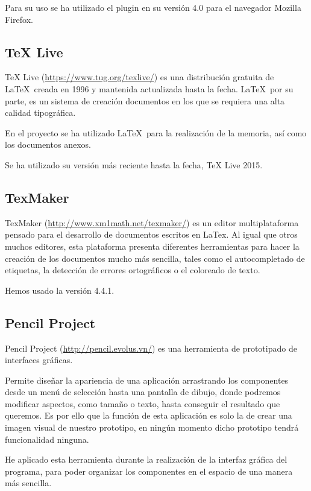 Para su uso se ha utilizado el plugin en su versión 4.0 para el navegador Mozilla Firefox.

\subsection{TeX Live}
TeX Live (\url{https://www.tug.org/texlive/}) es una distribución gratuita de \LaTeX\ creada en 1996 y mantenida actualizada hasta la fecha. \LaTeX\, por su parte, es un sistema de creación documentos en los que se requiera una alta calidad tipográfica.

En el proyecto se ha utilizado \LaTeX\ para la realización de la memoria, así como los documentos anexos.

Se ha utilizado su versión más reciente hasta la fecha, TeX Live 2015.

\subsection{TexMaker}

TexMaker (\url{http://www.xm1math.net/texmaker/}) es un editor multiplataforma pensado para el desarrollo de documentos escritos en LaTex. Al igual que otros muchos editores, esta plataforma presenta diferentes herramientas para hacer la creación de los documentos mucho más sencilla, tales como el autocompletado de etiquetas, la detección de errores ortográficos o el coloreado de texto.

Hemos usado la versión 4.4.1.

\subsection{Pencil Project}

Pencil Project (\url{http://pencil.evolus.vn/}) es una herramienta de prototipado de interfaces gráficas.

Permite diseñar la apariencia de una aplicación arrastrando los componentes desde un menú de selección hasta una pantalla de dibujo, donde podremos modificar aspectos, como tamaño o texto, hasta conseguir el resultado que queremos. Es por ello que la función de esta aplicación es solo la de crear una imagen visual de nuestro prototipo, en ningún momento dicho prototipo tendrá funcionalidad ninguna.

He aplicado esta herramienta durante la realización de la interfaz gráfica del programa, para poder organizar los componentes en el espacio de una manera más sencilla.

